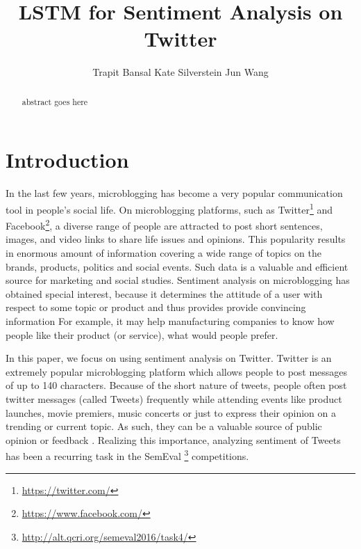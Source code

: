 \documentclass{article} %
\title{LSTM for Sentiment Analysis on Twitter}
\author{
Trapit Bansal
\And
Kate Silverstein
\And
Jun Wang
}
\begin{document}
\maketitle

\begin{abstract}
abstract goes here
\end{abstract}

\section{Introduction}
In the last few years, microblogging has become a very popular communication tool in people's social life.
On microblogging platforms, such as Twitter\footnote{\url{https://twitter.com/}} and Facebook\footnote{\url{https://www.facebook.com/}}, a diverse range of people are attracted to post short sentences, images, and video links to share life issues and opinions.
This popularity results in enormous amount of information covering a wide range of topics on the brands, products, politics and social events. 
Such data is a valuable and efficient source for marketing and social studies. 
Sentiment analysis on microblogging has obtained special interest, because it determines the attitude of a user with respect to some topic or product and thus provides provide convincing information
For example, it may help manufacturing companies to know how people like their product (or service), what would people prefer.  

In this paper, we focus on using sentiment analysis on Twitter. 
Twitter is an extremely popular microblogging platform which allows people to post messages of up to 140 characters.
Because of the short nature of tweets, people often post twitter messages (called Tweets) frequently while attending events like product launches, movie premiers, music concerts or just to express their opinion on a trending or current topic.
As such, they can be a valuable source of public opinion or feedback \cite{o2010tweets, bollen2011twitter, bollen2009modeling}.
Realizing this importance, analyzing sentiment of Tweets has been a recurring task in the SemEval \footnote{\url{http://alt.qcri.org/semeval2016/task4/}} competitions.

\end{document}
